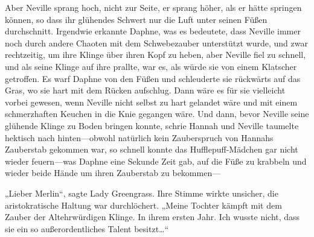 Aber Neville sprang hoch, nicht zur Seite, er sprang höher, als er hätte springen können, so dass ihr glühendes Schwert nur die Luft unter seinen Füßen durchschnitt. Irgendwie erkannte Daphne, was es bedeutete, dass Neville immer noch durch andere Chaoten mit dem Schwebezauber unterstützt wurde, und zwar rechtzeitig, um ihre Klinge über ihren Kopf zu heben, aber Neville fiel zu schnell, und als seine Klinge auf ihre prallte, war es, als würde sie von einem Klatscher getroffen. Es warf Daphne von den Füßen und schleuderte sie rückwärts auf das Gras, wo sie hart mit dem Rücken aufschlug. Dann wäre es für sie vielleicht vorbei gewesen, wenn Neville nicht selbst zu hart gelandet wäre und mit einem schmerzhaften Keuchen in die Knie gegangen wäre. Und dann, bevor Neville seine glühende Klinge zu Boden bringen konnte, schrie Hannah  und Neville taumelte hektisch nach hinten—obwohl natürlich kein Zauberspruch von Hannahs Zauberstab gekommen war, so schnell konnte das Hufflepuff-Mädchen gar nicht wieder feuern—was Daphne eine Sekunde Zeit gab, auf die Füße zu krabbeln und wieder beide Hände um ihren Zauberstab zu bekommen—

\later

„Lieber Merlin“, sagte Lady Greengrass. Ihre Stimme wirkte unsicher, die aristokratische Haltung war durchlöchert. „Meine Tochter kämpft mit dem Zauber der Altehrwürdigen Klinge. In ihrem ersten Jahr. Ich wusste nicht, dass sie ein so außerordentliches Talent besitzt…“

